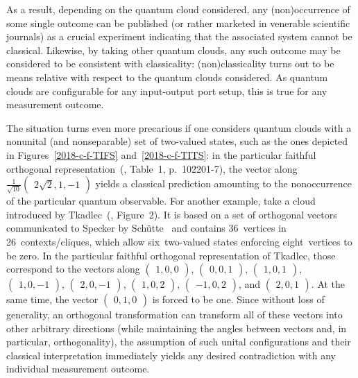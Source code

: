 As a result, depending on the quantum cloud considered, any (non)occurrence of some single outcome can be published
(or rather marketed in venerable scientific journals)
as a crucial experiment indicating that the associated system cannot be classical.
Likewise, by taking other quantum clouds, any such outcome may be considered to be consistent with classicality:
(non)classicality turns out to be {means relative} with respect to the quantum clouds considered.
As quantum clouds are configurable for any input-output port setup, this is true for any measurement outcome.


The situation turns even more precarious if one considers quantum clouds with a nonunital (and nonseparable) set of two-valued states,
such as the ones
depicted in Figures~\ref{2018-c-f-TIFS} and~\ref{2018-c-f-TITS}:
in the particular faithful orthogonal
representation~(\cite{2015-AnalyticKS}, Table~1, p.~102201-7),
the vector along
$\frac{1}{\sqrt{10}}\begin{pmatrix} 2\sqrt{2},1,-1 \end{pmatrix}$
yields a classical prediction amounting to the {nonoccurrence} of the particular
quantum observable. For another example,
take a cloud introduced by Tkadlec~(\cite{tkadlec-96}, Figure~2).
It is based on a set of orthogonal vectors
communicated to Specker by Sch\"utte~\cite{clavadetscher} and contains
36~vertices in 26~contexts/cliques, which allow six~two-valued states
enforcing eight~vertices to be zero. In the particular faithful orthogonal representation of Tkadlec,
those correspond to the vectors along
$\begin{pmatrix} 1,0,0 \end{pmatrix}$,
$\begin{pmatrix} 0,0,1 \end{pmatrix}$,
$\begin{pmatrix} 1,0,1 \end{pmatrix}$,
$\begin{pmatrix} 1,0,-1 \end{pmatrix}$,
$\begin{pmatrix} 2,0,-1 \end{pmatrix}$,
$\begin{pmatrix} 1,0,2 \end{pmatrix}$,
$\begin{pmatrix} -1,0,2 \end{pmatrix}$, and
$\begin{pmatrix} 2,0,1 \end{pmatrix}$.
At the same time, the vector
$\begin{pmatrix} 0,1,0 \end{pmatrix}$ is forced to be one.
Since without loss of generality, an orthogonal transformation can transform all of
these vectors into other arbitrary directions (while maintaining the angles between vectors and,
in particular, orthogonality),
the assumption of such unital configurations
and their classical interpretation
immediately yields any desired contradiction
with any individual measurement outcome.

